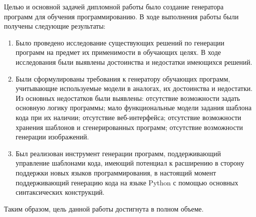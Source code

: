 
Целью и основной задачей дипломной работы было создание генератора программ для обучения
программированию. В ходе выполнения работы были получены следующие результаты:

\begin{enumerate}
    \item Было проведено исследование существующих решений по генерации программ на
          предмет их применимости в обучающих целях. В ходе исследования были выявлены достоинства и
          недостатки имеющихся решений.
    \item Были сформулированы требования к генератору обучающих программ, учитывающие используемые
          модели в аналогах, их достоинства и недостатки. Из основных недостатков были выявлены: отсутствие возможности
          задать основную логику программы; мало функциональные модели задания шаблона кода при их
          наличии; отсутствие веб-интерфейса; отсутствие возможности хранения шаблонов и
          сгенерированных программ; отсутствие возможности генерации изображений.
    \item Был реализован инструмент генерации программ, поддерживающий управление
          шаблонами кода, имеющий потенциал к расширению в сторону поддержки новых языков
          программирования, в настоящий момент поддерживающий генерацию кода на языке Python
          с помощью основных синтаксических конструкций.
\end{enumerate}

Таким образом, цель данной работы достигнута в полном объеме.